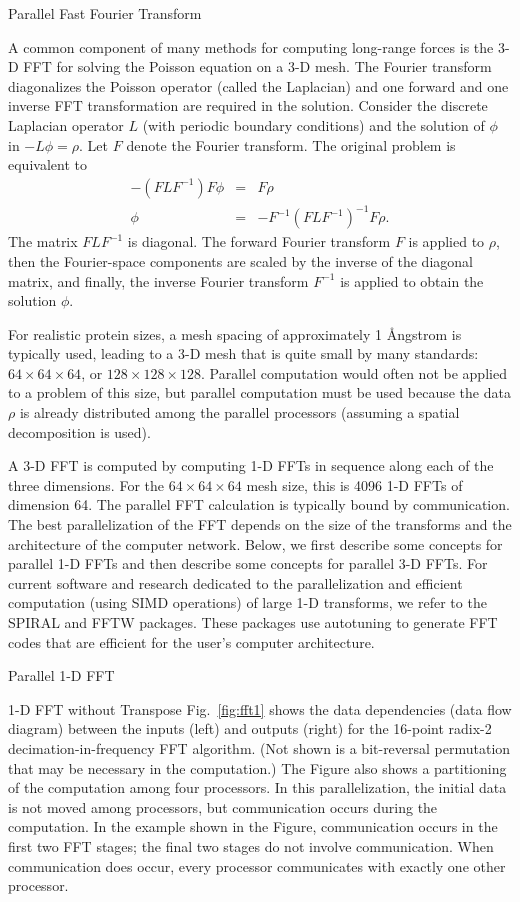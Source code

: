  {Parallel Fast Fourier Transform}
\label{sec:fft}

A common component of many methods for computing long-range forces
is the 3-D FFT for solving the Poisson equation on a 3-D mesh.
The Fourier transform diagonalizes the Poisson operator (called 
the Laplacian) and one
forward and one inverse FFT transformation are required in 
the solution.  Consider the discrete Laplacian operator $L$
(with periodic boundary conditions)
and the solution of $\phi$ in $-L \phi = \rho$.  Let $F$ denote
the Fourier transform.  The original problem is equivalent to
\begin{eqnarray*}
 - (F L F^{-1}) F \phi & = &  F \rho \\
 \phi & = & - F^{-1} (F L F^{-1})^{-1} F \rho .
\end{eqnarray*}
The matrix $F L F^{-1}$ is diagonal.  The forward Fourier transform
$F$ is applied to $\rho$, then the Fourier-space components are scaled
by the inverse of the diagonal matrix, and finally, the inverse
Fourier transform $F^{-1}$ is applied to obtain the solution $\phi$.

For realistic protein sizes, a mesh spacing of approximately 1 {\AA}ngstrom
is typically used, leading to a 3-D mesh that is quite small by many
standards:  $64 \times 64 \times 64$, or $128 \times 128 \times 128$.  
Parallel computation would often
not be applied to a problem of this size, but parallel computation must
be used because the data $\rho$ is already distributed among the parallel
processors (assuming a spatial decomposition is used).

A 3-D FFT is computed by computing 1-D FFTs in sequence along each of the
three dimensions.  For the $64 \times 64 \times 64$ mesh size, this is 4096 1-D
FFTs of dimension 64.  The parallel FFT calculation is typically bound
by communication.  The best parallelization of the FFT depends on the
size of the transforms and the architecture of the computer network.
Below, we first describe some concepts for parallel 1-D FFTs and then
describe some concepts for parallel 3-D FFTs.  For current software and
research dedicated to the parallelization and efficient computation
(using SIMD operations)
of large 1-D transforms, we refer to the SPIRAL and FFTW packages.
These packages use autotuning to generate FFT codes that are efficient
for the user's computer architecture.

 {Parallel 1-D FFT}

 {1-D FFT without Transpose}
Fig.~\ref{fig:fft1} shows the data dependencies (data flow diagram)
between the inputs (left) and outputs (right) for the 16-point radix-2
decimation-in-frequency FFT algorithm.  (Not shown is a bit-reversal
permutation that may be necessary in the computation.)  The Figure
also shows a partitioning of the computation among four processors.
In this parallelization, the initial data is not moved among processors,
but communication occurs during the computation.  In the example shown in
the Figure, communication occurs in the first two FFT stages; the final
two stages do not involve communication.  When communication does occur,
every processor communicates with exactly one other processor.

